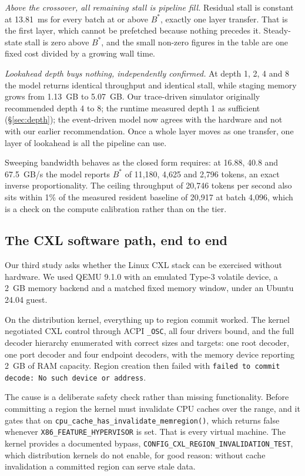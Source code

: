 \documentclass[10pt,a4paper]{article}
\begin{document}
\emph{Above the crossover, all remaining stall is pipeline fill.} Residual stall
is constant at 13.81~ms for every batch at or above $B^{*}$, exactly one layer
transfer. That is the first layer, which cannot be prefetched because nothing
precedes it. Steady-state stall is zero above $B^{*}$, and the small non-zero
figures in the table are one fixed cost divided by a growing wall time.

\emph{Lookahead depth buys nothing, independently confirmed.} At depth 1, 2, 4
and 8 the model returns identical throughput and identical stall, while staging
memory grows from 1.13~GB to 5.07~GB. Our trace-driven simulator originally
recommended depth 4 to 8; the runtime measured depth 1 as sufficient
(\S\ref{sec:depth}); the event-driven model now agrees with the hardware and not
with our earlier recommendation. Once a whole layer moves as one transfer, one
layer of lookahead is all the pipeline can use.

Sweeping bandwidth behaves as the closed form requires: at 16.88, 40.8 and
67.5~GB/s the model reports $B^{*}$ of 11{,}180, 4{,}625 and 2{,}796 tokens, an
exact inverse proportionality. The ceiling throughput of 20{,}746 tokens per
second also sits within 1\% of the measured resident baseline of 20{,}917 at
batch 4{,}096, which is a check on the compute calibration rather than on the
tier.

\subsection{The CXL software path, end to end}

Our third study asks whether the Linux CXL stack can be exercised without
hardware. We used QEMU 9.1.0 with an emulated Type-3 volatile device, a 2~GB
memory backend and a matched fixed memory window, under an Ubuntu 24.04 guest.

On the distribution kernel, everything up to region commit worked. The kernel
negotiated CXL control through ACPI \texttt{\_OSC}, all four drivers bound, and
the full decoder hierarchy enumerated with correct sizes and targets: one root
decoder, one port decoder and four endpoint decoders, with the memory device
reporting 2~GB of RAM capacity. Region creation then failed with
\texttt{failed to commit decode: No such device or address}.

\begin{sloppypar}
The cause is a deliberate safety check rather than missing functionality.
Before committing a region the kernel must invalidate CPU caches over the
range, and it gates that on \texttt{cpu\_cache\_has\_invalidate\_memregion()},
which returns false whenever \texttt{X86\_FEATURE\_HYPERVISOR} is set. That is
every virtual machine. The kernel provides a documented bypass,
\texttt{CONFIG\_CXL\_REGION\_INVALIDATION\_TEST}, which distribution kernels do
not enable, for good reason: without cache invalidation a committed region can
serve stale data.
\end{sloppypar}
\end{document}

